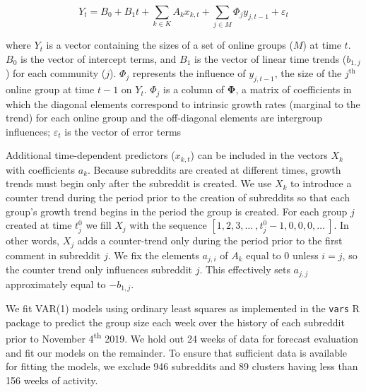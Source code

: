 \documentclass[letterpaper]{article}\usepackage[]{graphicx}\usepackage[]{color}
\begin{document}
\begin{equation}\label{eq:var1}
Y_t = B_0 + B_1t + \sum_{k \in K}A_k x_{k,t} + \sum_{j \in M}\Phi_{j} y_{j,t-1} + \varepsilon_t
\end{equation}

\noindent where $Y_t$ is a vector containing the sizes of a set of online groups ($M$) at time $t$. $B_0$ is the vector of intercept terms, and $B_1$ is the vector of linear time trends ($b_{1,j}$) for each community ($j$). $\Phi_{j}$ represents the influence of $y_{j,t-1}$, the size of the $j^{\mathrm{th}}$ online group at time $t-1$ on $Y_t$. $\Phi_{j}$ is a column of $\mathbf{\Phi}$, a matrix of coefficients in which the diagonal elements correspond to intrinsic growth rates (marginal to the trend) for each online group and the off-diagonal elements are intergroup influences; $\varepsilon_t$ is the vector of error terms

Additional time-dependent predictors ($x_{k,t}$) can be included in the vectors $X_{k}$ with coefficients $a_k$. Because subreddits are created at different times, growth trends must begin only after the subreddit is created. We use $X_{k}$ to introduce a  counter trend during the period prior to the creation of subreddits so that each group's growth trend begins in the period the group is created. For each group $j$ created at time $t^0_j$ we fill $X_{j}$ with the sequence $[1,2,3,\ldots\ ,t^0_j-1,0,0,0,\ldots\ ]$. In other words, $X_{j}$ adds a counter-trend only during the period prior to the first comment in subreddit $j$. We fix the elements $a_{j,i}$ of $A_k$ equal to 0 unless $i=j$, so the counter trend only influences subreddit $j$. This effectively sets $a_{j,j}$ approximately equal to $-b_{1,j}$. 

We fit VAR(1) models using ordinary least squares as implemented in the \texttt{vars} R package to predict the group size each week over the history of each subreddit prior to November 4\textsuperscript{th} 2019. We hold out 24 weeks of data for forecast evaluation and fit our models on the remainder. To ensure that sufficient data is available for fitting the models, we exclude 946 subreddits and 89 clusters having less than 156 weeks of activity. 

\end{document}

